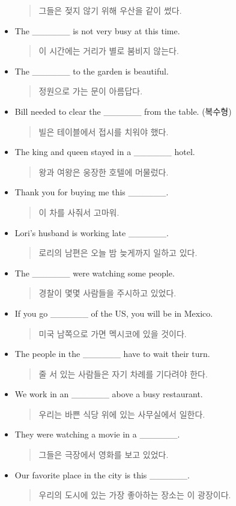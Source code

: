 \documentclass{article}
\begin{document}
\begin{addmargin}[1em]{1em}
\begin{itemize}
\begin{quote}
    그들은 젖지 않기 위해 우산을 같이 썼다.
    \end{quote}
    \item The \_\_\_\_\_\_ is not very busy at this time.
    \begin{quote}
    이 시간에는 거리가 별로 붐비지 않는다.
    \end{quote}
    \item The \_\_\_\_\_\_ to the garden is beautiful.
    \begin{quote}
    정원으로 가는 문이 아름답다.
    \end{quote}
    \item Bill needed to clear the \_\_\_\_\_\_ from the table. (복수형)
    \begin{quote}
    빌은 테이블에서 접시를 치워야 했다.
    \end{quote}
    \item The king and queen stayed in a \_\_\_\_\_\_ hotel.
    \begin{quote}
    왕과 여왕은 웅장한 호텔에 머물렀다.
    \end{quote}
    \newpage
    \item Thank you for buying me this \_\_\_\_\_\_.
    \begin{quote}
    이 차를 사줘서 고마워.
    \end{quote}
    \item Lori's husband is working late \_\_\_\_\_\_.
    \begin{quote}
    로리의 남편은 오늘 밤 늦게까지 일하고 있다.
    \end{quote}
    \item The \_\_\_\_\_\_ were watching some people.
    \begin{quote}
    경찰이 몇몇 사람들을 주시하고 있었다.
    \end{quote}
    \item If you go \_\_\_\_\_\_ of the US, you will be in Mexico.
    \begin{quote}
    미국 남쪽으로 가면 멕시코에 있을 것이다.
    \end{quote}
    \item The people in the \_\_\_\_\_\_ have to wait their turn.
    \begin{quote}
    줄 서 있는 사람들은 자기 차례를 기다려야 한다.
    \end{quote}
    \item We work in an \_\_\_\_\_\_ above a busy restaurant.
    \begin{quote}
    우리는 바쁜 식당 위에 있는 사무실에서 일한다.
    \end{quote}
    \item They were watching a movie in a \_\_\_\_\_\_.
    \begin{quote}
    그들은 극장에서 영화를 보고 있었다.
    \end{quote}
    \item Our favorite place in the city is this \_\_\_\_\_\_.
    \begin{quote}
    우리의 도시에 있는 가장 좋아하는 장소는 이 광장이다.
    \end{quote}
\end{itemize}
\end{addmargin}
\end{document}
